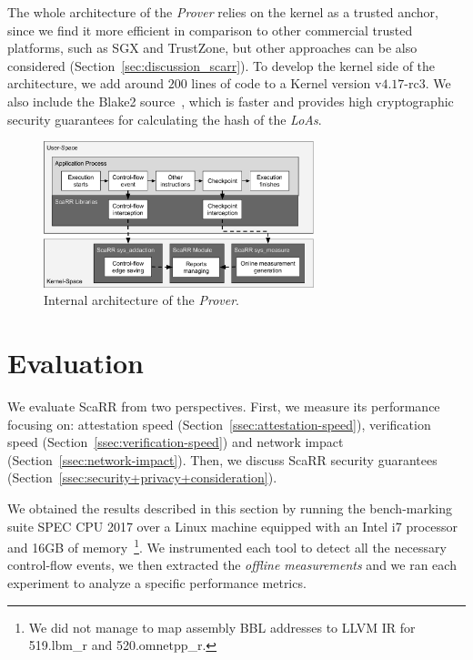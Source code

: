 The whole architecture of the \emph{Prover} relies on the kernel as a trusted 
anchor, since we find it more efficient in comparison to other commercial 
trusted platforms, such as SGX and TrustZone, but other approaches can be also 
considered (Section~\ref{sec:discussion_scarr}). To develop the kernel side of 
the 
architecture, we add around $200$ lines of code to a Kernel version 
v$4.17$-rc$3$.
We also include the Blake2 source~\cite{Aumasson2014,blake2}, which is faster 
and provides high cryptographic security guarantees for calculating the hash of 
the \emph{LoAs}.
\begin{figure}[t]
	\centering
	\includegraphics[width=0.7\textwidth]{fig_c4/architecture.pdf}
	\caption{Internal architecture of the \emph{Prover}.}
	\label{fig:architecture_scarr}
\end{figure}

\section{Evaluation}
\label{sec:evaluation_scarr_scarr}
We evaluate ScaRR from two perspectives.
First, we measure its performance focusing on: attestation speed 
(Section~\ref{ssec:attestation-speed}), verification speed 
(Section~\ref{ssec:verification-speed}) and network impact 
(Section~\ref{ssec:network-impact}).
Then, we discuss ScaRR security guarantees 
(Section~\ref{ssec:security+privacy+consideration}). 

We obtained the results described in this section by running the bench-marking 
suite SPEC CPU 2017 over a Linux machine
equipped with an Intel i7 processor and 16GB of memory~\footnote{We did not 
manage to map assembly BBL addresses to LLVM IR for 519.lbm\_r and 
520.omnetpp\_r.}.
We instrumented each tool to detect all the necessary control-flow events, we 
then extracted the \emph{offline measurements} and we ran each experiment to 
analyze a specific performance metrics. 

